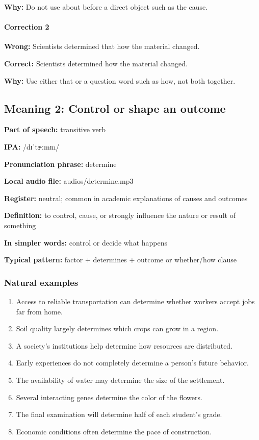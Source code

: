 \documentclass[11pt]{article}
\begin{document}
\textbf{Why:} Do not use about before a direct object such as the cause.

\paragraph{Correction 2}
\textbf{Wrong:} Scientists determined that how the material changed.

\textbf{Correct:} Scientists determined how the material changed.

\textbf{Why:} Use either that or a question word such as how, not both together.

\subsection{Meaning 2: Control or shape an outcome}
\textbf{Part of speech:} transitive verb

\textbf{IPA:} /dɪˈtɝːmɪn/

\textbf{Pronunciation phrase:} determine

\textbf{Local audio file:} audios/determine.mp3

\textbf{Register:} neutral; common in academic explanations of causes and outcomes

\textbf{Definition:} to control, cause, or strongly influence the nature or result of something

\textbf{In simpler words:} control or decide what happens

\textbf{Typical pattern:} factor + determines + outcome or whether/how clause

\subsubsection{Natural examples}
\begin{enumerate}
  \item Access to reliable transportation can determine whether workers accept jobs far from home.
  \item Soil quality largely determines which crops can grow in a region.
  \item A society's institutions help determine how resources are distributed.
  \item Early experiences do not completely determine a person's future behavior.
  \item The availability of water may determine the size of the settlement.
  \item Several interacting genes determine the color of the flowers.
  \item The final examination will determine half of each student's grade.
  \item Economic conditions often determine the pace of construction.
\end{enumerate}
\end{document}
